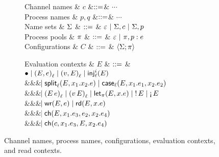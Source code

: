 \begin{figure*}[t]
\centering
\begin{subfigure}{0.35\textwidth}
\begin{grammar}
  Channel names & $c$   &$\bnfas$& $\cdots$
  \\
  Process names & $p,q$ &$\bnfas$& $\cdots$
  \\
  Name sets
  & $\Names$ 
    & $\bnfas$ & $\emptyNames ~|~ \Names, c ~|~ \Names, p$
  \\
  Process pools
  & $\Procs$ 
  & $\bnfas$ & $\emptyProcs ~|~ \Procs, \ProcNm{p} \proc{e}$
  \\
  Configurations
  & $C$
     & $\bnfas$ & $\Config{\Names}{}{\Procs} $
\end{grammar}
\end{subfigure}%
\begin{subfigure}{0.5\textwidth}
  \begin{grammar}
 Evaluation contexts
  & $E$
 & $\bnfas$ &
$\bullet \bnfalt \ePair{E}{e}{\ell} \bnfalt \ePair{v}{E}{\ell} \bnfalt \eInjj{\ell}{i}{E}$ 
\\ &&& $\bnfaltbrk \eSplitt{\ell}{E}{x_1}{x_2}{e} \bnfalt
\eCase{\ell}{E}{x_1}{e_1}{x_2}{e_2}$
\\ &&& $\bnfaltbrk \eApp{E}{e}{\ell} \bnfalt \eApp{v}{E}{\ell}  \bnfalt \eLet{x}{E}{e}
\bnfalt \eBang{E} \bnfalt \eUnbang{E}$
\\ &&& $\bnfaltbrk \eWr{E}{e} \bnfalt \eLetRd{E}{x}{e}$
\\ &&& $\bnfaltbrk \eChoicee{E}{x_1}{e_3}{e_2}{x_2}{e_4}$
\\ &&& $\bnfaltbrk \eChoicee{c}{x_1}{e_3}{E}{x_2}{e_4}$
\end{grammar}
\end{subfigure}
\caption{Channel names, process names, configurations, evaluation contexts, and
  read contexts.}
\label{fig:configs}
\end{figure*}

